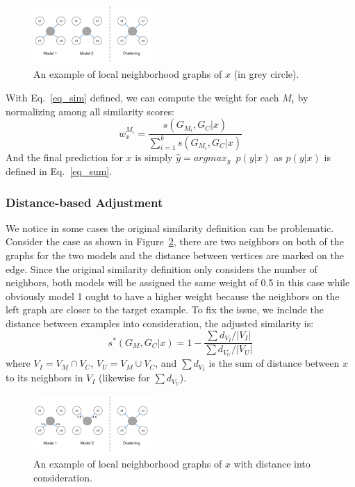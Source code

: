 \begin{figure}[h]
\centering
    \includegraphics[width=0.4\textwidth]{./fig/lwe_graph}
\caption{An example of local neighborhood graphs of $x$ (in grey circle).}
\label{fig:graph}
\end{figure}

With Eq.~\ref{eq_sim} defined, we can compute the weight for each $M_i$ by normalizing among all similarity scores:
\begin{equation}\label{eq_norm}
w_{x}^{M_i} = \frac {s(G_{M_i}, G_C|x)} {\sum_{i=1}^k s(G_{M_i}, G_C|x)}
\end{equation}
And the final prediction for $x$ is simply $\hat y = argmax_y \enspace p(y|x)$ as $p(y|x)$ is defined in Eq.~\ref{eq_sum}.

\subsubsection{Distance-based Adjustment}
We notice in some cases the original similarity definition can be problematic. Consider the case as shown in Figure~\ref{graph_dist}, there are two neighbors on both of the graphs for the two models and the distance between vertices are marked on the edge. Since the original similarity definition only considers the number of neighbors, both models will be assigned the same weight of 0.5 in this case while obviously model 1 ought to have a higher weight because the neighbors on
the left graph are closer to the target example.
To fix the issue, we include the distance between examples into consideration, the adjusted similarity is:
\begin{equation}\label{d_sim}
s^\ast(G_M, G_C|x) = 1 - \frac {\sum d_{V_I}/|V_I|} {\sum d_{V_U}/|V_U|}
\end{equation}
where $V_I = V_M \cap V_C$, $V_U = V_M \cup V_C$, and $\sum d_{V_I}$ is the sum of distance between $x$ to its neighbors in $V_I$ (likewise for $\sum d_{V_U}$).

\begin{figure}[h]
\centering
    \includegraphics[width=0.4\textwidth]{./fig/lwe_d_graph}
\caption{An example of local neighborhood graphs of $x$ with distance into consideration.}
\label{graph_dist}
\end{figure}

